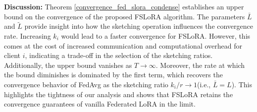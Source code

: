 \documentclass{article} %
\theoremstyle{plain}
\theoremstyle{definition}
\begin{document}
\textbf{Discussion:} Theorem \ref{convergence_fed_slora_condense} establishes an upper bound on the convergence of the proposed FSLoRA algorithm. The parameters \(\bar{L}\) and \(\widetilde{L}\) provide insight into how the sketching operation influences the convergence rate. Increasing \(k_i\) would lead to a faster convergence for FSLoRA. However, this comes at the cost of increased communication and computational overhead for client $i$, indicating a trade-off in the selection of the sketching ratios. 
Additionally, the upper bound vanishes as $T \rightarrow \infty$. Moreover, the rate at which the bound diminishes is dominated by the first term, which recovers the convergence behavior of FedAvg \citep{yu2019parallel,khaled2020tighter,karimireddy2020scaffold} as the sketching ratio $k_i/r \to 1$(i.e., $\bar{L} = L$). This highlights the tightness of our analysis and shows that FSLoRA retains the convergence guarantees of vanilla Federated LoRA in the limit.
\end{document}
